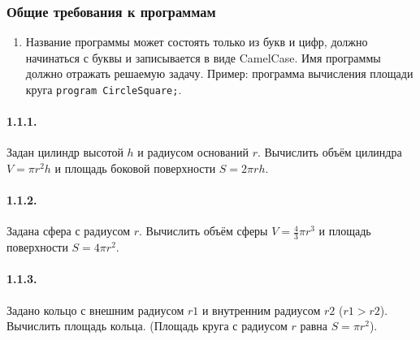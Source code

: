 \documentclass[12pt,a4paper]{report}
\begin{document}
\parindent=1cm
\pagestyle{empty}

\clearpage

\subsubsection*{Общие требования к программам}
\begin{enumerate}
\item Название программы может состоять только из букв и цифр, должно начинаться с буквы и записывается в виде CamelCase. Имя программы должно отражать решаемую задачу.
Пример: программа вычисления площади круга \texttt{program CircleSquare;}.
\end{enumerate}

\paragraph*{1.1.1.} Задан цилиндр высотой $h$ и радиусом оснований $r$. Вычислить объём цилиндра $V = \pi r^2 h$ и площадь боковой поверхности $S = 2 \pi r h$.

\paragraph*{1.1.2.} Задана сфера с радиусом $r$. Вычислить объём сферы $V = \frac {4} {3} \pi r^3$ и площадь поверхности $S = 4 \pi r^2$.

\paragraph*{1.1.3.} Задано кольцо с внешним радиусом $r1$ и внутренним радиусом $r2$ ($r1 > r2$). Вычислить площадь кольца. (Площадь круга с радиусом $r$ равна $S = \pi r^2$).
\end{document}
